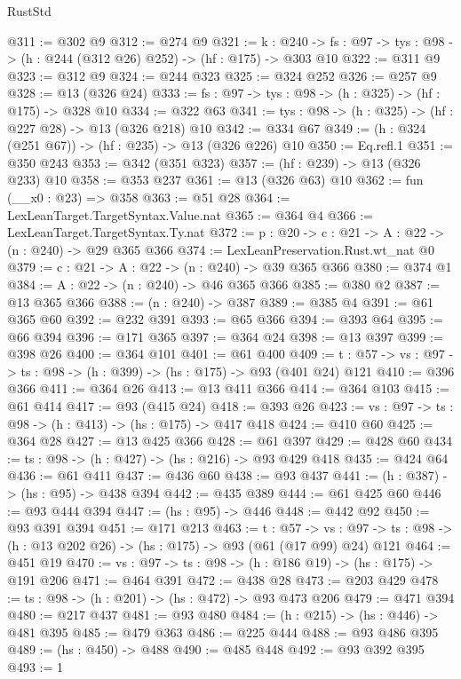 \begin{lexlean}{RustStd}
\begin{coremodule}
{\begin{coremodule}
{{{{{{@311 := @302 @9
@312 := @274 @9
@321 := {k : @240} ->
  {fs : @97} -> {tys : @98} -> (h : @244 (@312 @26) @252) -> (hf : @175) -> @303 @10
@322 := @311 @9
@323 := @312 @9
@324 := @244 @323
@325 := @324 @252
@326 := @257 @9
@328 := @13 (@326 @24)
@333 := {fs : @97} -> {tys : @98} -> (h : @325) -> (hf : @175) -> @328 @10
@334 := @322 @63
@341 := {tys : @98} -> (h : @325) -> (hf : @227 @28) -> @13 (@326 @218) @10
@342 := @334 @67
@349 := (h : @324 (@251 @67)) -> (hf : @235) -> @13 (@326 @226) @10
@350 := Eq.refl.{1}
@351 := @350 @243
@353 := @342 (@351 @323)
@357 := (hf : @239) -> @13 (@326 @233) @10
@358 := @353 @237
@361 := @13 (@326 @63) @10
@362 := fun (__x0 : @23) => @358
@363 := @51 @28
@364 := LexLeanTarget.TargetSyntax.Value.nat
@365 := @364 @4
@366 := LexLeanTarget.TargetSyntax.Ty.nat
@372 := {p : @20} -> {c : @21} -> {A : @22} -> (n : @240) -> @29 @365 @366
@374 := LexLeanPreservation.Rust.wt_nat @0
@379 := {c : @21} -> {A : @22} -> (n : @240) -> @39 @365 @366
@380 := @374 @1
@384 := {A : @22} -> (n : @240) -> @46 @365 @366
@385 := @380 @2
@387 := @13 @365 @366
@388 := (n : @240) -> @387
@389 := @385 @4
@391 := @61 @365 @60
@392 := @232 @391
@393 := @65 @366
@394 := @393 @64
@395 := @66 @394
@396 := @171 @365
@397 := @364 @24
@398 := @13 @397
@399 := @398 @26
@400 := @364 @101
@401 := @61 @400
@409 := {t : @57} -> {vs : @97} -> {ts : @98} -> (h : @399) -> (hs : @175) -> @93 (@401 @24) @121
@410 := @396 @366
@411 := @364 @26
@413 := @13 @411 @366
@414 := @364 @103
@415 := @61 @414
@417 := @93 (@415 @24)
@418 := @393 @26
@423 := {vs : @97} -> {ts : @98} -> (h : @413) -> (hs : @175) -> @417 @418
@424 := @410 @60
@425 := @364 @28
@427 := @13 @425 @366
@428 := @61 @397
@429 := @428 @60
@434 := {ts : @98} -> (h : @427) -> (hs : @216) -> @93 @429 @418
@435 := @424 @64
@436 := @61 @411
@437 := @436 @60
@438 := @93 @437
@441 := (h : @387) -> (hs : @95) -> @438 @394
@442 := @435 @389
@444 := @61 @425 @60
@446 := @93 @444 @394
@447 := (hs : @95) -> @446
@448 := @442 @92
@450 := @93 @391 @394
@451 := @171 @213
@463 := {t : @57} ->
  {vs : @97} -> {ts : @98} -> (h : @13 @202 @26) -> (hs : @175) -> @93 (@61 (@17 @99) @24) @121
@464 := @451 @19
@470 := {vs : @97} -> {ts : @98} -> (h : @186 @19) -> (hs : @175) -> @191 @206
@471 := @464 @391
@472 := @438 @28
@473 := @203 @429
@478 := {ts : @98} -> (h : @201) -> (hs : @472) -> @93 @473 @206
@479 := @471 @394
@480 := @217 @437
@481 := @93 @480
@484 := (h : @215) -> (hs : @446) -> @481 @395
@485 := @479 @363
@486 := @225 @444
@488 := @93 @486 @395
@489 := (hs : @450) -> @488
@490 := @485 @448
@492 := @93 @392 @395
@493 := 1
}}}}}}
\end{coremodule}}
\end{coremodule}
\end{lexlean}
